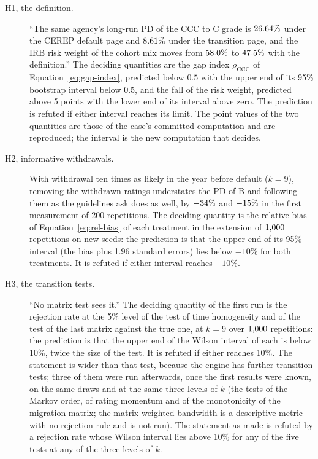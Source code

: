 \begin{description}
\item[H1, the definition.] ``The same agency's long-run PD of the CCC to C grade is $26.64\%$ under the CEREP default page and $8.61\%$ under the transition page, and the IRB risk weight of the cohort mix moves from $58.0\%$ to $47.5\%$ with the definition.'' The deciding quantities are the gap index $\rho_{\mathrm{CCC}}$ of Equation~\eqref{eq:gap-index}, predicted below $0.5$ with the upper end of its 95\% bootstrap interval below $0.5$, and the fall of the risk weight, predicted above 5 points with the lower end of its interval above zero. The prediction is refuted if either interval reaches its limit. The point values of the two quantities are those of the case's committed computation and are reproduced; the interval is the new computation that decides.
\item[H2, informative withdrawals.] With withdrawal ten times as likely in the year before default ($k=9$), removing the withdrawn ratings understates the PD of B and following them as the guidelines ask does as well, by $-34\%$ and $-15\%$ in the first measurement of 200 repetitions. The deciding quantity is the relative bias of Equation~\eqref{eq:rel-bias} of each treatment in the extension of $1{,}000$ repetitions on new seeds: the prediction is that the upper end of its 95\% interval (the bias plus 1.96 standard errors) lies below $-10\%$ for both treatments. It is refuted if either interval reaches $-10\%$. %
\item[H3, the transition tests.] ``No matrix test sees it.'' The deciding quantity of the first run is the rejection rate at the 5\% level of the test of time homogeneity and of the test of the last matrix against the true one, at $k=9$ over $1{,}000$ repetitions: the prediction is that the upper end of the Wilson interval of each is below 10\%, twice the size of the test. It is refuted if either reaches 10\%. The statement is wider than that test, because the engine has further transition tests; three of them were run afterwards, once the first results were known, on the same draws and at the same three levels of $k$ (the tests of the Markov order, of rating momentum and of the monotonicity of the migration matrix; the matrix weighted bandwidth is a descriptive metric with no rejection rule and is not run). The statement as made is refuted by a rejection rate whose Wilson interval lies above 10\% for any of the five tests at any of the three levels of $k$.

\end{description}
